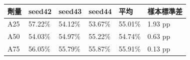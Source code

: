 \begin{tabular}{llllll}
\toprule
劑量 & seed42 & seed43 & seed44 & 平均 & 樣本標準差\\
\midrule
A25 & 57.22\% & 54.12\% & 53.67\% & 55.01\% & 1.93 pp\\
A50 & 54.03\% & 54.97\% & 55.22\% & 54.74\% & 0.63 pp\\
A75 & 56.05\% & 55.79\% & 55.87\% & 55.91\% & 0.13 pp\\
\bottomrule
\end{tabular}
